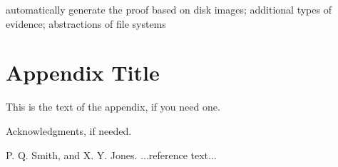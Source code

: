 \documentclass{sigplanconf}
\begin{document}
automatically generate the proof based on disk images; additional types of
evidence; abstractions of file systems


\appendix
\section{Appendix Title}

This is the text of the appendix, if you need one.

\acks

Acknowledgments, if needed.





\begin{thebibliography}{}
\softraggedright

P. Q. Smith, and X. Y. Jones. ...reference text...

\end{thebibliography}
\end{document}
